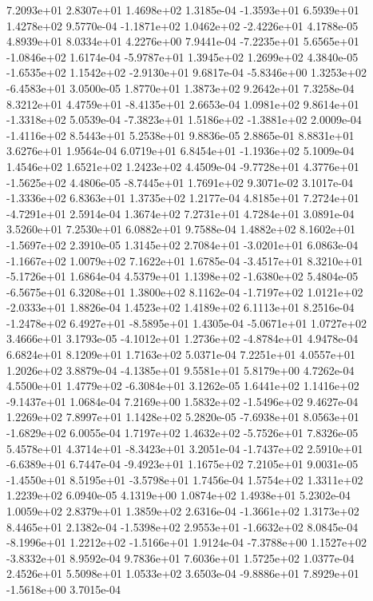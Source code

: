 7.2093e+01 2.8307e+01 1.4698e+02  1.3185e-04
-1.3593e+01  6.5939e+01  1.4278e+02  9.5770e-04
-1.1871e+02  1.0462e+02 -2.4226e+01  4.1788e-05
4.8939e+01 8.0334e+01 4.2276e+00  7.9441e-04
-7.2235e+01  5.6565e+01 -1.0846e+02  1.6174e-04
-5.9787e+01  1.3945e+02  1.2699e+02  4.3840e-05
-1.6535e+02  1.1542e+02 -2.9130e+01  9.6817e-04
-5.8346e+00  1.3253e+02 -6.4583e+01  3.0500e-05
1.8770e+01 1.3873e+02 9.2642e+01  7.3258e-04
 8.3212e+01  4.4759e+01 -8.4135e+01  2.6653e-04
 1.0981e+02  9.8614e+01 -1.3318e+02  5.0539e-04
-7.3823e+01  1.5186e+02 -1.3881e+02  2.0009e-04
-1.4116e+02  8.5443e+01  5.2538e+01  9.8836e-05
2.8865e-01 8.8831e+01 3.6276e+01  1.9564e-04
 6.0719e+01  6.8454e+01 -1.1936e+02  5.1009e-04
1.4546e+02 1.6521e+02 1.2423e+02  4.4509e-04
-9.7728e+01  4.3776e+01 -1.5625e+02  4.4806e-05
-8.7445e+01  1.7691e+02  9.3071e-02  3.1017e-04
-1.3336e+02  6.8363e+01  1.3735e+02  1.2177e-04
 4.8185e+01  7.2724e+01 -4.7291e+01  2.5914e-04
1.3674e+02 7.2731e+01 4.7284e+01  3.0891e-04
3.5260e+01 7.2530e+01 6.0882e+01  9.7588e-04
 1.4882e+02  8.1602e+01 -1.5697e+02  2.3910e-05
 1.3145e+02  2.7084e+01 -3.0201e+01  6.0863e-04
-1.1667e+02  1.0079e+02  7.1622e+01  1.6785e-04
-3.4517e+01  8.3210e+01 -5.1726e+01  1.6864e-04
 4.5379e+01  1.1398e+02 -1.6380e+02  5.4804e-05
-6.5675e+01  6.3208e+01  1.3800e+02  8.1162e-04
-1.7197e+02  1.0121e+02 -2.0333e+01  1.8826e-04
1.4523e+02 1.4189e+02 6.1113e+01  8.2516e-04
-1.2478e+02  6.4927e+01 -8.5895e+01  1.4305e-04
-5.0671e+01  1.0727e+02  3.4666e+01  3.1793e-05
-4.1012e+01  1.2736e+02 -4.8784e+01  4.9478e-04
6.6824e+01 8.1209e+01 1.7163e+02  5.0371e-04
7.2251e+01 4.0557e+01 1.2026e+02  3.8879e-04
-4.1385e+01  9.5581e+01  5.8179e+00  4.7262e-04
 4.5500e+01  1.4779e+02 -6.3084e+01  3.1262e-05
 1.6441e+02  1.1416e+02 -9.1437e+01  1.0684e-04
 7.2169e+00  1.5832e+02 -1.5496e+02  9.4627e-04
1.2269e+02 7.8997e+01 1.1428e+02  5.2820e-05
-7.6938e+01  8.0563e+01 -1.6829e+02  6.0055e-04
 1.7197e+02  1.4632e+02 -5.7526e+01  7.8326e-05
 5.4578e+01  4.3714e+01 -8.3423e+01  3.2051e-04
-1.7437e+02  2.5910e+01 -6.6389e+01  6.7447e-04
-9.4923e+01  1.1675e+02  7.2105e+01  9.0031e-05
-1.4550e+01  8.5195e+01 -3.5798e+01  1.7456e-04
1.5754e+02 1.3311e+02 1.2239e+02  6.0940e-05
4.1319e+00 1.0874e+02 1.4938e+01  5.2302e-04
1.0059e+02 2.8379e+01 1.3859e+02  2.6316e-04
-1.3661e+02  1.3173e+02  8.4465e+01  2.1382e-04
-1.5398e+02  2.9553e+01 -1.6632e+02  8.0845e-04
-8.1996e+01  1.2212e+02 -1.5166e+01  1.9124e-04
-7.3788e+00  1.1527e+02 -3.8332e+01  8.9592e-04
9.7836e+01 7.6036e+01 1.5725e+02  1.0377e-04
2.4526e+01 5.5098e+01 1.0533e+02  3.6503e-04
-9.8886e+01  7.8929e+01 -1.5618e+00  3.7015e-04
